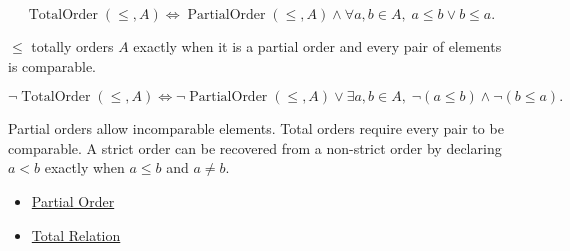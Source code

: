 \begin{remark*}
\[
\operatorname{TotalOrder}(\leq,A)
\Longleftrightarrow
\operatorname{PartialOrder}(\leq,A)
\land
\forall a,b\in A,\; a\leq b \lor b\leq a.
\]
\end{remark*}

\begin{remark*}
$\leq$ totally orders $A$ exactly when it is a partial order and every pair of
elements is comparable.
\end{remark*}

\begin{remark*}
\[
\neg\operatorname{TotalOrder}(\leq,A)
\Longleftrightarrow
\neg\operatorname{PartialOrder}(\leq,A)
\lor
\exists a,b\in A,\; \lnot(a\leq b)\land\lnot(b\leq a).
\]
\end{remark*}

\begin{remark*}[Interpretation]
Partial orders allow incomparable elements.  Total orders require every pair
to be comparable.  A strict order can be recovered from a non-strict order by
declaring $a<b$ exactly when $a\leq b$ and $a\neq b$.
\end{remark*}

\begin{dependencies}
\begin{itemize}
  \item \hyperref[def:algebraic-partial-order]{Partial Order}
  \item \hyperref[def:rel-total]{Total Relation}
\end{itemize}
\end{dependencies}
